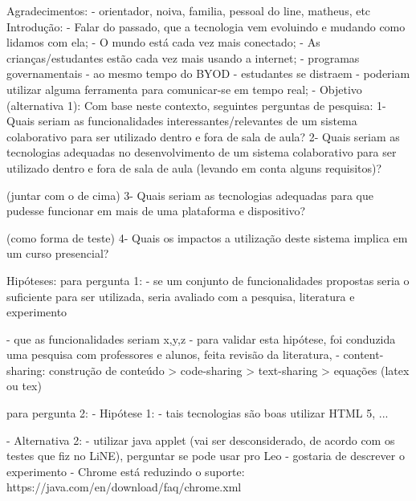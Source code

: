 \fi





\iffalse
        Agradecimentos: 
            - orientador, noiva, familia, pessoal do line, matheus, etc
        Introdução:
            - Falar do passado, que a tecnologia vem evoluindo e mudando como lidamos com ela;
            - O mundo está cada vez mais conectado;
            - As crianças/estudantes estão cada vez mais usando a internet;
            - programas governamentais 
            - ao mesmo tempo do BYOD
                - estudantes se distraem
                - poderiam utilizar alguma ferramenta para comunicar-se em tempo real;
            - Objetivo (alternativa 1):
                Com base neste contexto, seguintes perguntas de pesquisa:
                    1- Quais seriam as funcionalidades interessantes/relevantes de um sistema colaborativo para ser utilizado dentro e fora de sala de aula?
                    2- Quais seriam as tecnologias adequadas no desenvolvimento de um sistema colaborativo para ser utilizado dentro e fora de sala de aula (levando em conta alguns requisitos)?

                    (juntar com o de cima) 3- Quais seriam as tecnologias adequadas para que pudesse funcionar em mais de uma plataforma e dispositivo?

                    (como forma de teste) 4- Quais os impactos a utilização deste sistema implica em um curso presencial?

                    Hipóteses:
                    para pergunta 1:
                        - se um conjunto de funcionalidades propostas seria o suficiente para ser utilizada, seria avaliado com a pesquisa, literatura e experimento

                        - que as funcionalidades seriam x,y,z
                            - para validar esta hipótese, foi conduzida uma pesquisa com professores e alunos, feita revisão da literatura, 
                        - content-sharing: construção de conteúdo > code-sharing > text-sharing > equações (latex ou tex)

                    para pergunta 2:
                        - Hipótese 1:
                            - tais tecnologias são boas utilizar HTML 5, ...

                            - Alternativa 2:
                                - utilizar java applet (vai ser desconsiderado, de acordo com os testes que fiz no LiNE), perguntar se pode usar pro Leo - gostaria de descrever o experimento
                                - Chrome está reduzindo o suporte:
                                    https://java.com/en/download/faq/chrome.xml

